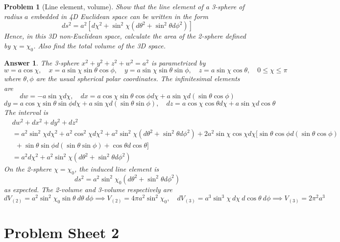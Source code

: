 \documentclass[a4paper]{article}
\newtheorem{ans}{Answer}[subsection]
\theoremstyle{new}
\newtheorem{qns}{Problem}[section]
\begin{document}
\begin{qns}[Line element, volume]
Show that the line element of a 3-sphere of radius $a$ embedded in 4D Euclidean space can be written in the form
$$ds^2=a^2[d\chi^2+\sin^2\chi(d\theta^2+\sin^2\theta d\phi^2)]$$
Hence, in this 3D non-Euclidean space, calculate the area of the 2-sphere defined by $\chi=\chi_0$. Also find the total volume of the 3D space.
\end{qns}
\begin{ans}
The 3-sphere $x^2+y^2+z^2+w^2=a^2$ is parametrized by
$$w=a\cos\chi,\quad x=a\sin\chi\sin\theta\cos\phi,\quad y=a\sin\chi\sin\theta\sin\phi,\quad z=a\sin\chi\cos\theta,\quad 0\leq\chi\leq\pi$$
where $\theta,\phi$ are the usual spherical polar coordinates. The infinitesimal elements are
$$dw=-a\sin\chi d\chi,\quad dx=a\cos\chi\sin\theta\cos\phi d\chi+a\sin\chi d(\sin\theta\cos\phi)$$
$$dy=a\cos\chi\sin\theta\sin\phi d\chi+a\sin\chi d(\sin\theta\sin\phi),\quad dz=a\cos\chi\cos\theta d\chi+a\sin\chi d\cos\theta$$
The interval is
\begin{align}
    &dw^2+dx^2+dy^2+dz^2\nonumber\\&=a^2\sin^2\chi d\chi^2+a^2\cos^2\chi d\chi^2+a^2\sin^2\chi(d\theta^2+\sin^2\theta d\phi^2)+2a^2\sin\chi\cos\chi d\chi[\sin\theta\cos\phi d(\sin\theta\cos\phi)\nonumber\\&~~+\sin\theta\sin\phi d(\sin\theta\sin\phi)+\cos\theta d\cos\theta]\nonumber\\&=a^2d\chi^2+a^2\sin^2\chi(d\theta^2+\sin^2\theta d\phi^2)\nonumber
\end{align}
On the 2-sphere $\chi=\chi_0$, the induced line element is
$$ds^2=a^2\sin^2\chi_0(d\theta^2+\sin^2\theta d\phi^2)$$
as expected. The 2-volume and 3-volume respectively are
$$dV_{(2)}=a^2\sin^2\chi_0\sin\theta~d\theta~d\phi\implies V_{(2)}=4\pi a^2\sin^2\chi_0,\quad dV_{(3)}=a^3\sin^3\chi~d\chi~d\cos\theta~d\phi\implies V_{(3)}=2\pi^2a^3$$
\end{ans}


\newpage
\section{Problem Sheet 2}
\end{document}
